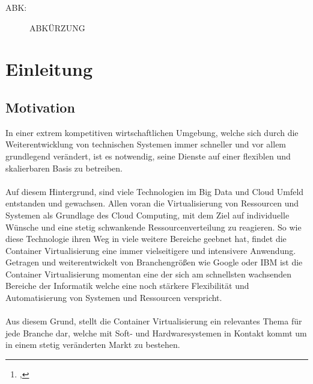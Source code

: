 \documentclass[12pt,toc=bib,toc=listof]{scrreprt}
\title{\ebttopic}
\author{\ebtstudentname\footnote{\ebtstudentid, \ebtstudentmail}}
\begin{document}
\maketitle
\tableofcontents

\label{sec:abkuerzungsverzeichnis}

\begin{description}
  \item[ABK:] ABKÜRZUNG 
\end{description}


\listoffigures

\onehalfspacing
\newpage
{}

\chapter{Einleitung} %
\label{sec:einleitung}

\section{Motivation} %
\label{sec:motivation}

In einer extrem kompetitiven wirtschaftlichen Umgebung, welche sich durch die Weiterentwicklung von technischen Systemen immer schneller und vor allem grundlegend verändert,
ist es notwendig, seine Dienste auf einer flexiblen und skalierbaren Basis zu betreiben.\\
\\
Auf diesem Hintergrund, sind viele Technologien im Big Data und Cloud Umfeld entstanden und gewachsen.
Allen voran die Virtualisierung von Ressourcen und Systemen als Grundlage des Cloud Computing, mit dem Ziel auf individuelle Wünsche und eine stetig schwankende Ressourcenverteilung zu reagieren.
So wie diese Technologie ihren Weg in viele weitere Bereiche geebnet hat, findet die Container Virtualisierung eine immer vielseitigere und intensivere Anwendung.
Getragen und weiterentwickelt von Branchengrößen wie Google oder IBM ist die Container Virtualisierung momentan eine der sich am schnellsten wachsenden Bereiche der Informatik welche eine noch stärkere Flexibilität und Automatisierung von Systemen und Ressourcen verspricht.\\
\\
Aus diesem Grund, stellt die Container Virtualisierung ein relevantes Thema für jede Branche dar, welche mit Soft- und Hardwaresystemen in Kontakt kommt um in einem stetig veränderten Markt zu bestehen.
\end{document}
